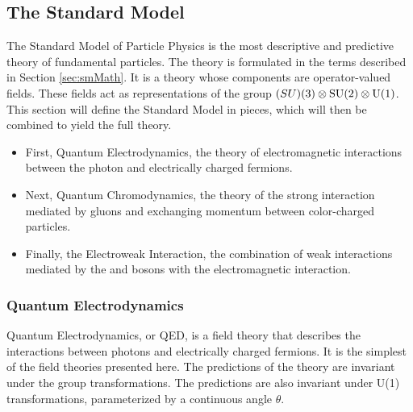 \subsection{The Standard Model}

The Standard Model of Particle Physics is the most descriptive and predictive theory of fundamental particles.
The theory is formulated in the terms described in Section \ref{sec:smMath}.
It is a theory whose components are operator-valued fields.
These fields act as representations of the group $\text(SU)(3)\otimes\text{SU}(2)\otimes\text{U}(1)$.
This section will define the Standard Model in pieces, which will then be combined to yield the full theory.
\begin{itemize}
    \item First, Quantum Electrodynamics, the theory of electromagnetic interactions between the photon and electrically charged fermions.
    \item Next, Quantum Chromodynamics, the theory of the strong interaction mediated by gluons and exchanging momentum between color-charged particles.
    \item Finally, the Electroweak Interaction, the combination of weak interactions mediated by the \W and \Z bosons with the electromagnetic interaction.
\end{itemize}

\subsubsection{Quantum Electrodynamics}

Quantum Electrodynamics, or QED, is a field theory that describes the interactions between photons and electrically charged fermions.
It is the simplest of the field theories presented here.
The predictions of the theory are invariant under the \poincare group transformations.
The predictions are also invariant under U(1) transformations, parameterized by a continuous angle $ \theta $.

